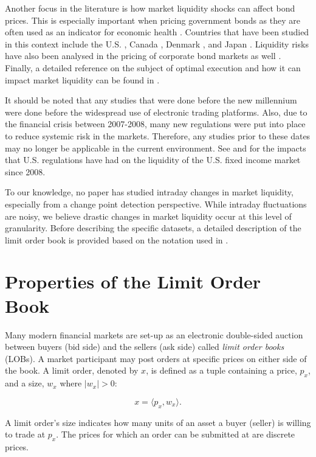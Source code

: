 Another focus in the literature is how market liquidity shocks can affect bond prices. This is especially important when pricing government bonds as they are often used as an indicator for economic health \cite{zaloom2009read}. Countries that have been studied in this context include the U.S. \cite{mccauley2000iv}, Canada \cite{gungor2017has}, Denmark \cite{dick2013funding}, and Japan \cite{sakiyama2016market}. Liquidity risks have also been analysed in the pricing of corporate bond markets as well \cite{de2012liquidity}. Finally, a detailed reference on the subject of optimal execution and how it can impact market liquidity can be found in \cite{gueant2016financial}.

It should be noted that any studies that were done before the new millennium were done before the widespread use of electronic trading platforms. Also, due to the financial crisis between 2007-2008, many new regulations were put into place to reduce systemic risk in the markets. Therefore, any studies prior to these dates may no longer be applicable in the current environment. See  \cite{adrian2017market} and \cite{trebbi2019regulation} for the impacts that U.S. regulations have had on the liquidity of the U.S. fixed income market since 2008.

To our knowledge, no paper has studied intraday changes in market liquidity, especially from a change point detection perspective. While intraday fluctuations are noisy, we believe drastic changes in market liquidity occur at this level of granularity. Before describing the specific datasets, a detailed description of the limit order book is provided based on the notation used in \cite{gould2016queue}. 

\section{Properties of the Limit Order Book}
\label{prop_book}
Many modern financial markets are set-up as an electronic double-sided auction between buyers (bid side) and the sellers (ask side) called \textit{limit order books} (LOBs). A market participant may post orders at specific prices on either side of the book. A limit order, denoted by $x$, is defined as a tuple containing a price, $p_x$, and a size, $w_x$ where $|w_x|>0$:

\begin{equation}
x = \langle p_x, w_x \rangle.
\end{equation}

A limit order's size indicates how many units of an asset a buyer (seller) is willing to trade at $p_x$. The prices for which an order can be submitted at are discrete prices. 

